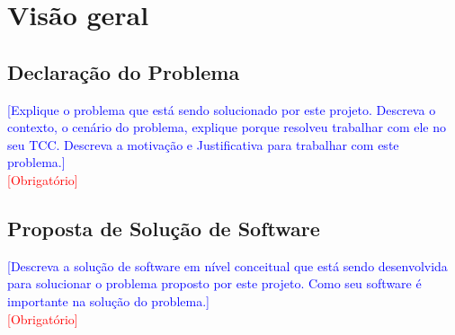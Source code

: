 \documentclass[10pt]{relatorio_tcc_ads_ifba}
\begin{document}


\date{21 de janeiro de 2024}



\pretextual

\section{Visão geral }




\subsection{Declaração do Problema}
\textcolor{blue}{
    [Explique o problema que está sendo solucionado por este projeto. Descreva o contexto, o cenário do problema, explique porque resolveu trabalhar com ele no seu TCC. Descreva a motivação e Justificativa para trabalhar com este problema.]
} \\
\textcolor{red}{[Obrigatório]}

\subsection{Proposta de Solução de Software}
\textcolor{blue}{
    [Descreva a solução de software em nível conceitual que está sendo desenvolvida para solucionar o problema proposto por este projeto. Como seu software é importante na solução do problema.]
} \\
\textcolor{red}{[Obrigatório]}
\end{document}
